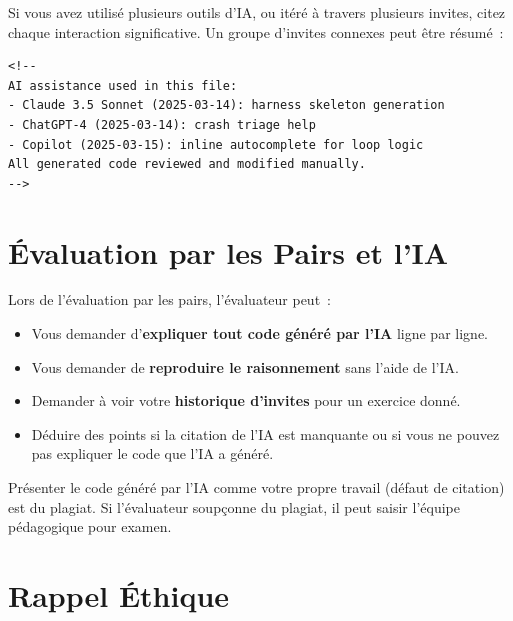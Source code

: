 Si vous avez utilisé plusieurs outils d'IA, ou itéré à travers
plusieurs invites, citez chaque interaction significative. Un
groupe d'invites connexes peut être résumé~:

\begin{verbatim}
<!--
AI assistance used in this file:
- Claude 3.5 Sonnet (2025-03-14): harness skeleton generation
- ChatGPT-4 (2025-03-14): crash triage help
- Copilot (2025-03-15): inline autocomplete for loop logic
All generated code reviewed and modified manually.
-->
\end{verbatim}

\section{Évaluation par les Pairs et l'IA}

Lors de l'évaluation par les pairs, l'évaluateur peut~:

\begin{itemize}
  \item Vous demander d'\textbf{expliquer tout code généré par l'IA}
        ligne par ligne.
  \item Vous demander de \textbf{reproduire le raisonnement} sans
        l'aide de l'IA.
  \item Demander à voir votre \textbf{historique d'invites} pour un
        exercice donné.
  \item Déduire des points si la citation de l'IA est manquante ou
        si vous ne pouvez pas expliquer le code que l'IA a généré.
\end{itemize}

\begin{warning}
  Présenter le code généré par l'IA comme votre propre travail
  (défaut de citation) est du plagiat. Si l'évaluateur soupçonne
  du plagiat, il peut saisir l'équipe pédagogique pour examen.
\end{warning}

\section{Rappel Éthique}

